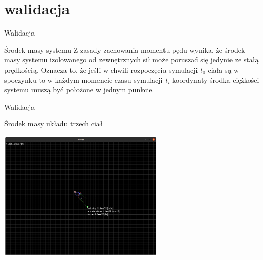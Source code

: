 \documentclass{beamer}
\begin{document}
\section{walidacja}

\begin{frame}{Walidacja}
    \begin{block}{Środek masy systemu}
        Z zasady zachowania momentu pędu wynika, że środek masy systemu izolowanego od zewnętrznych sił może poruszać się jedynie ze stałą prędkością. Oznacza to, że jeśli w chwili rozpoczęcia symulacji $t_{0}$ ciała są w spoczynku to w każdym momencie czasu symulacji $t_{i}$ koordynaty środka ciężkości systemu muszą być położone w jednym punkcie.
    \end{block}
\end{frame}

\begin{frame}{Walidacja}
    \begin{block}{Środek masy układu trzech ciał}
        \begin{center}
            \includegraphics[width=8cm]{./img/three-bodies.png}
        \end{center}
    \end{block}
\end{frame}
\end{document}
